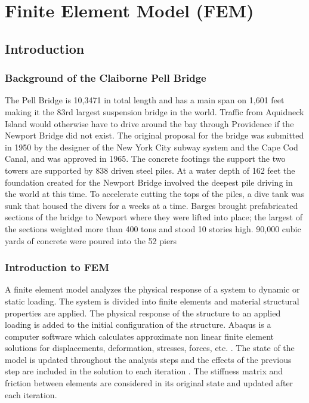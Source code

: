 \chapter{Finite Element Model (FEM)}

\section{Introduction}

\label{sec:examples}

\subsection{Background of the Claiborne Pell Bridge}

The Pell Bridge is 10,3471 in total length and has a main span on 1,601 feet making it the 83rd largest suspension bridge in the world. Traffic from
Aquidneck Island would otherwise have to drive around the bay through Providence if the Newport Bridge did not exist. The original proposal for the
bridge was submitted in 1950 by the designer of the New York City subway system and the Cape Cod Canal, and was approved in 1965. The concrete footings
the support the two towers are supported by 838 driven steel piles. At a water depth of 162 feet the foundation created for the Newport Bridge
involved the deepest pile driving in the world at this time. To accelerate cutting the tops of the piles, a dive tank was sunk that housed the divers
for a weeks at a time. Barges brought prefabricated sections of the bridge to Newport where they were lifted into place; the largest of the sections
weighted more than 400 tons and stood 10 stories high. 90,000 cubic yards of concrete were poured into the 52 piers \cite{RIBTA}\\ 

\subsection{Introduction to FEM}

A finite element model analyzes the physical response of a system to dynamic or static loading. The system is divided into finite elements and material
structural properties are applied. The physical response of the structure to an applied loading is added to the initial configuration of the structure.
Abaqus is a computer software which calculates approximate non linear finite element solutions for displacements, deformation, stresses, forces, etc. .
The state of the model is updated throughout the analysis steps and the effects of the previous step are included in the solution to each iteration
\cite{Abaqus}. The stiffness matrix and friction between elements are considered in its original state and updated after each iteration. \cite{Manoj}\\

